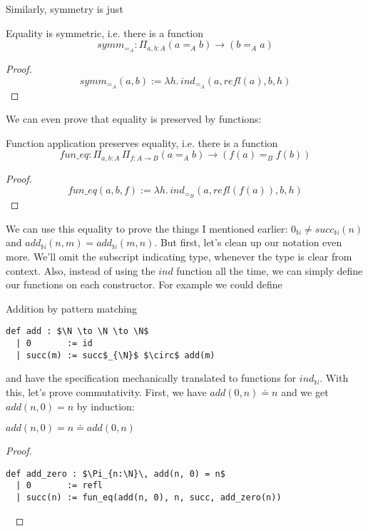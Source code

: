 \documentclass[a4paper, 12pt]{article}
\newcommand{\N}{\mathbb{N}}
\newcommand{\la}[1]{\lambda{#1}.\,}
\theoremstyle{changedot}
\theoremstyle{changedotbreak}
\theoremstyle{nonumberplain}
\newtheorem{proof}{Proof}
\begin{document}
Similarly, symmetry is just
\begin{theorem}
  Equality is symmetric, i.e. there is a function
  \[symm_{=_{A}} : \Pi_{a, b : A} (a =_{A} b) \to (b =_{A} a) \]
\end{theorem}
\begin{proof}
  \[symm_{=_{A}}(a, b) := \la h ind_{=_{A}}(a, refl(a), b, h)\]
\end{proof}

We can even prove that equality is preserved by functions:
\begin{theorem}
  Function application preserves equality, i.e. there is a function
  \[\mathit{fun\_eq} : \Pi_{a, b: A}\, \Pi_{f : A \to B} (a =_{A} b) \to (f(a) =_{B} f(b))\]
\end{theorem}
\begin{proof}
  \[\mathit{fun\_eq}(a, b, f) := \la h ind_{=_{B}}(a, refl(f(a)), b, h)\]
\end{proof}

We can use this equality to prove the things I mentioned earlier: $0_{\N} \neq succ_{\N}(n)$ and $add_{\N}(n, m) = add_{\N}(m, n)$. But first, let's clean up our notation even more. We'll omit the subscript indicating type, whenever the type is clear from context. Also, instead of using the $ind$ function all the time, we can simply define our functions on each constructor. For example we could define
\begin{definition} Addition by pattern matching
\begin{lstlisting}[mathescape=true]
  def add : $\N \to \N \to \N$
  | 0       := id
  | succ(m) := succ$_{\N}$ $\circ$ add(m)
\end{lstlisting}
\end{definition}

and have the specification mechanically translated to functions for $ind_{\N}$. With this, let's prove commutativity. First, we have $add(0, n) \doteq n$ and we get $add(n, 0) = n$ by induction:

\begin{lemma}
  $add(n, 0) = n \doteq add(0, n)$
\end{lemma}
\begin{proof} ~
\begin{lstlisting}[mathescape=true]
  def add_zero : $\Pi_{n:\N}\, add(n, 0) = n$
  | 0       := refl
  | succ(n) := fun_eq(add(n, 0), n, succ, add_zero(n))
\end{lstlisting}~
\end{proof}
\end{document}
